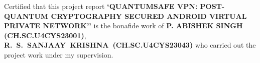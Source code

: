 \documentclass[12pt,a4paper]{report}
\begin{document}
\noindent
Certified that this project report \textbf{`QUANTUMSAFE VPN: POST-QUANTUM CRYPTOGRAPHY SECURED ANDROID VIRTUAL PRIVATE NETWORK''} is the bonafide work of \textbf{P. ABISHEK SINGH (CH.SC.U4CYS23001)}, \newline
\mbox{\textbf{R. S. SANJAAY KRISHNA (CH.SC.U4CYS23043)}} who carried out the project work under my supervision.
\end{document}
